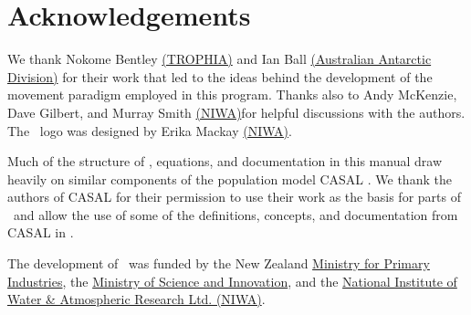 \section{Acknowledgements\label{sec:acknowledgements}}

We thank Nokome Bentley \href{http://www.trophia.co.nz}{(TROPHIA)} and Ian Ball \href{http://www.aad.gov.au}{(Australian Antarctic Division)} for their work that led to the ideas behind the development of the movement paradigm employed in this program. Thanks also to Andy McKenzie, Dave Gilbert, and Murray Smith \href{http://www.niwa.co.nz}{(NIWA)}for  helpful discussions with the authors. The \SPM\ logo was designed by Erika Mackay \href{http://www.niwa.co.nz}{(NIWA)}. 

Much of the structure of \SPM, equations, and documentation in this manual draw heavily on similar components of the population model CASAL \citep{1388}. We thank the authors of CASAL for their permission to use their work as the basis for parts of \SPM\ and allow the use of some of the definitions, concepts, and documentation from CASAL in \SPM. 

The development of \SPM\ was funded by the New Zealand \href{http://www.mpi.govt.nz}{Ministry for Primary Industries}, the \href{http://www.msi.govt.nz}{Ministry of Science and Innovation}, and the \href{http://www.niwa.co.nz}{National Institute of Water \& Atmospheric Research Ltd. (NIWA)}. 
